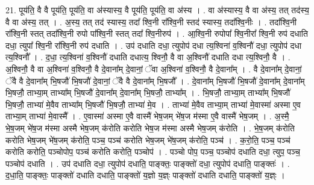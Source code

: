 \documentclass[17pt]{extarticle}
\begin{document}
21. पूय॑ति॒ वै वै पूय॑ति॒ पूय॑ति॒ वा अ॑स्यास्य॒ वै पूय॑ति॒ पूय॑ति॒ वा अ॑स्य । . वा अ॑स्यास्य॒ वै वा अ॑स्य॒ तत् तद॑स्य॒ वै वा अ॑स्य॒ तत् । . अ॒स्य॒ तत् तद॑ स्यास्य॒ तदा᳚ श्वि॒नी रा᳚श्वि॒नी स्तद॑ स्यास्य॒ तदा᳚श्वि॒नीः । . तदा᳚श्वि॒नी रा᳚श्वि॒नी स्तत् तदा᳚श्वि॒नी रुपो पा᳚श्वि॒नी स्तत् तदा᳚ श्वि॒नीरुप॑ । . आ॒श्वि॒नी रुपोपा᳚ श्वि॒नीरा᳚ श्वि॒नी रुप॑ दधाति दधा॒ त्युपा᳚ श्वि॒नी रा᳚श्वि॒नी रुप॑ दधाति । . उप॑ दधाति दधा॒ त्युपोप॑ दधा त्य॒श्विना॑ व॒श्विनौ॑ दधा॒ त्युपोप॑ दधा त्य॒श्विनौ᳚ । . द॒धा॒ त्य॒श्विना॑ व॒श्विनौ॑ दधाति दधात्य॒ श्विनौ॒ वै वा अ॒श्विनौ॑ दधाति दधा त्य॒श्विनौ॒ वै । . अ॒श्विनौ॒ वै वा अ॒श्विना॑ व॒श्विनौ॒ वै दे॒वाना᳚म् दे॒वानां॒ ॅवा अ॒श्विना॑ व॒श्विनौ॒ वै दे॒वाना᳚म् । . वै दे॒वाना᳚म् दे॒वानां॒ ॅवै वै दे॒वाना᳚म् भि॒षजौ॑ भि॒षजौ॑ दे॒वानां॒ ॅवै वै दे॒वाना᳚म् भि॒षजौ᳚ । . दे॒वाना᳚म् भि॒षजौ॑ भि॒षजौ॑ दे॒वाना᳚म् दे॒वाना᳚म् भि॒षजौ॒ ताभ्या॒म् ताभ्या᳚म् भि॒षजौ॑ दे॒वाना᳚म् दे॒वाना᳚म् भि॒षजौ॒ ताभ्या᳚म् । . भि॒षजौ॒ ताभ्या॒म् ताभ्या᳚म् भि॒षजौ॑ भि॒षजौ॒ ताभ्या॑ मे॒वैव ताभ्या᳚म् भि॒षजौ॑ भि॒षजौ॒ ताभ्या॑ मे॒व । . ताभ्या॑ मे॒वैव ताभ्या॒म् ताभ्या॑ मे॒वास्मा॑ अस्मा ए॒व ताभ्या॒म् ताभ्या॑ मे॒वास्मै᳚ । . ए॒वास्मा॑ अस्मा ए॒वै वास्मै॑ भेष॒जम् भे॑ष॒ज म॑स्मा ए॒वै वास्मै॑ भेष॒जम् । . अ॒स्मै॒ भे॒ष॒जम् भे॑ष॒ज म॑स्मा अस्मै भेष॒जम् क॑रोति करोति भेष॒ज म॑स्मा अस्मै भेष॒जम् क॑रोति । . भे॒ष॒जम् क॑रोति करोति भेष॒जम् भे॑ष॒जम् क॑रोति॒ पञ्च॒ पञ्च॑ करोति भेष॒जम् भे॑ष॒जम् क॑रोति॒ पञ्च॑ । . क॒रो॒ति॒ पञ्च॒ पञ्च॑ करोति करोति॒ पञ्चोपोप॒ पञ्च॑ करोति करोति॒ पञ्चोप॑ । . पञ्चो पोप॒ पञ्च॒ पञ्चोप॑ दधाति दधा॒ त्युप॒ पञ्च॒ पञ्चोप॑ दधाति । . उप॑ दधाति दधा॒ त्युपोप॑ दधाति॒ पाङ्क्तः॒ पाङ्क्तो॑ दधा॒ त्युपोप॑ दधाति॒ पाङ्क्तः॑ । . द॒धा॒ति॒ पाङ्क्तः॒ पाङ्क्तो॑ दधाति दधाति॒ पाङ्क्तो॑ य॒ज्ञो य॒ज्ञ्ः पाङ्क्तो॑ दधाति दधाति॒ पाङ्क्तो॑ य॒ज्ञ्ः । \newline
\end{document}
